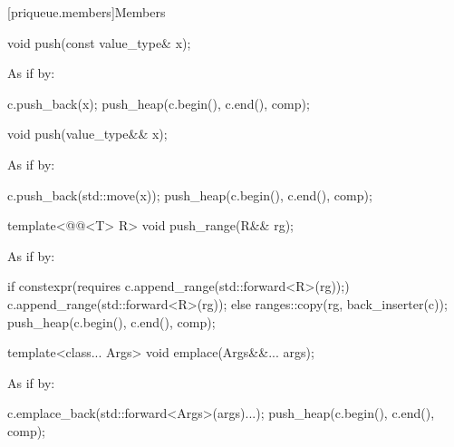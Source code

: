 \documentclass{wg21}
\begin{document}
[priqueue.members]{Members}

%
\begin{itemdecl}
    void push(const value_type& x);
\end{itemdecl}

\begin{itemdescr}
    \pnum
    \effects
    As if by:
    \begin{codeblock}
        c.push_back(x);
        push_heap(c.begin(), c.end(), comp);
    \end{codeblock}
\end{itemdescr}

%
\begin{itemdecl}
    void push(value_type&& x);
\end{itemdecl}

\begin{itemdescr}
    \pnum
    \effects
    As if by:
    \begin{codeblock}
        c.push_back(std::move(x));
        push_heap(c.begin(), c.end(), comp);
    \end{codeblock}
\end{itemdescr}

\begin{addedblock}
%
\begin{itemdecl}
template<@@<T> R>
void push_range(R&& rg);
\end{itemdecl}
\begin{itemdescr}
    \pnum
    \effects
    As if by:
    \begin{codeblock}
        if constexpr(requires {c.append_range(std::forward<R>(rg));}) {
             c.append_range(std::forward<R>(rg));
        }
        else {
            ranges::copy(rg, back_inserter(c));
        }
        push_heap(c.begin(), c.end(), comp);
    \end{codeblock}
\end{itemdescr}
\end{addedblock}


%
\begin{itemdecl}
    template<class... Args> void emplace(Args&&... args);
\end{itemdecl}

\begin{itemdescr}
    \pnum
    \effects
    As if by:
    \begin{codeblock}
        c.emplace_back(std::forward<Args>(args)...);
        push_heap(c.begin(), c.end(), comp);
    \end{codeblock}
\end{itemdescr}
\end{document}
